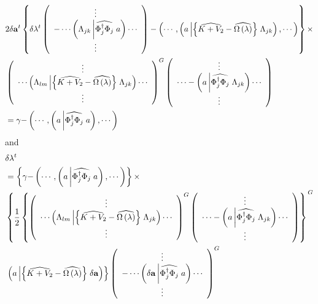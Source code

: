 \documentclass[aps,preprint]{revtex4}%
\begin{document}
\begin{align}
&  2\delta\mathbf{a}^{t}\left\{  \delta\mathbf{\lambda}^{t}\left(
\begin{array}
[c]{c}%
\vdots\\
-\cdots\left(  \Lambda_{jk}\left\vert \widehat{\Phi_{j}^{\dagger}\Phi_{j}%
}\right.  a\right)  \cdots\\
\vdots
\end{array}
\right)  -\left(  \cdots,\left(  a\left\vert \left\{  \widehat{K+V_{2}%
}-\widehat{\Omega\left(  \lambda\right)  }\right\}  \right.  \Lambda
_{jk}\right)  ,\cdots\right)  \right\}  \times\nonumber\\
&  \left(
\begin{array}
[c]{c}%
\vdots\\
\cdots\left(  \Lambda_{lm}\left\vert \left\{  \widehat{K+V_{2}}-\widehat
{\Omega\left(  \lambda\right)  }\right\}  \right.  \Lambda_{jk}\right)
\cdots\\
\vdots
\end{array}
\right)  ^{G}\left(
\begin{array}
[c]{c}%
\vdots\\
\cdots-\left(  a\left\vert \widehat{\Phi_{j}^{\dagger}\Phi_{j}}\right.
\Lambda_{jk}\right)  \cdots\\
\vdots
\end{array}
\right) \nonumber\\
&  =\mathbf{\gamma-}\left(  \cdots,\left(  a\left\vert \widehat{\Phi
_{j}^{\dagger}\Phi_{j}}\right.  a\right)  ,\cdots\right)
\end{align}
and
\begin{align}
&  \delta\mathbf{\lambda}^{t}\nonumber\\
&  =\left\{  \mathbf{\gamma-}\left(  \cdots,\left(  a\left\vert \widehat
{\Phi_{j}^{\dagger}\Phi_{j}}\right.  a\right)  ,\cdots\right)  \right\}
\times\nonumber\\
&  \left\{  \frac{1}{2}\left\{  \left(
\begin{array}
[c]{c}%
\vdots\\
\cdots\left(  \Lambda_{lm}\left\vert \left\{  \widehat{K+V_{2}}-\widehat
{\Omega\left(  \lambda\right)  }\right\}  \right.  \Lambda_{jk}\right)
\cdots\\
\vdots
\end{array}
\right)  ^{G}\left(
\begin{array}
[c]{c}%
\vdots\\
\cdots-\left(  a\left\vert \widehat{\Phi_{j}^{\dagger}\Phi_{j}}\right.
\Lambda_{jk}\right)  \cdots\\
\vdots
\end{array}
\right)  \right\}  \right.  ^{G}\nonumber\\
&  \left.  \left(  a\left\vert \left\{  \widehat{K+V_{2}}-\widehat
{\Omega\left(  \lambda\right)  }\right\}  \right.  \delta\mathbf{a}\right)
\right\}  \left(
\begin{array}
[c]{c}%
\vdots\\
-\cdots\left(  \delta\mathbf{a}\left\vert \widehat{\Phi_{j}^{\dagger}\Phi_{j}%
}\right.  a\right)  \cdots\\
\vdots
\end{array}
\right)  ^{G}%
\end{align}
\end{document}
